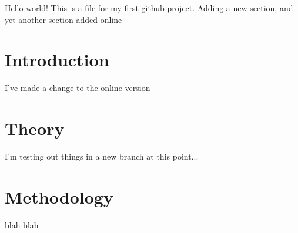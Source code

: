 \documentclass{article}
\begin{document}
Hello world! This is a file for my first github project. Adding a new section, and yet another section added online
\section{Introduction}

I've made a change to the online version

\section{Theory}

I'm testing out things in a new branch at this point...

\section{Methodology}


blah blah
\end{document}
